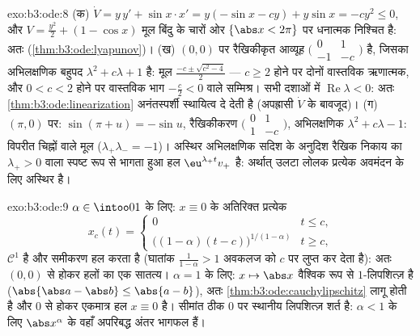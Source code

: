 \begin{solution}{exo:b3:ode:8}
(क) $\dot V = y\,y' + \sin x\cdot x' = y(-\sin x - cy) +
y\sin x = -cy^2 \leq 0$, और $V = \frac{y^2}2 + (1 - \cos x)$ मूल बिंदु के चारों ओर $\{\abs x < 2\pi\}$ पर धनात्मक निश्चित
है: अतः  (\cref{thm:b3:ode:lyapunov})।
(ख) $(0,0)$ पर रैखिकीकृत आव्यूह $\bigl(\begin{smallmatrix}0 & 1\\ -1 &
-c\end{smallmatrix}\bigr)$ है, जिसका अभिलक्षणिक बहुपद $\lambda^2 + c\lambda + 1$
है: मूल $\frac{-c \pm \sqrt{c^2 -
4}}2$ --- $c \geq 2$ होने पर दोनों वास्तविक ऋणात्मक, और $0 < c < 2$ होने
पर वास्तविक भाग $-\frac c2 < 0$ वाले सम्मिश्र। सभी दशाओं में $\operatorname{Re}\lambda < 0$: अतः \cref{thm:b3:ode:linearization}
अनंतस्पर्शी स्थायित्व दे देती है (अपह्रासी $\dot V$ के बावजूद)।
(ग) $(\pi, 0)$ पर: $\sin(\pi + u) = -\sin u$, रैखिकीकरण $\bigl(\begin{smallmatrix}0&1\\1&-c\end{smallmatrix}\bigr)$, अभिलक्षणिक $\lambda^2 + c\lambda - 1$: विपरीत
चिह्नों वाले मूल ($\lambda_+\lambda_- = -1$)। अस्थिर अभिलक्षणिक सदिश के अनुदिश रैखिक
निकाय का $\lambda_+ > 0$ वाला स्पष्ट रूप से भागता हुआ हल $\eu^{\lambda_+t}v_+$ है: अर्थात्
उलटा लोलक प्रत्येक अवमंदन के लिए अस्थिर है।
\end{solution}

\begin{solution}{exo:b3:ode:9}
$\alpha \in \intoo01$ के लिए: $x \equiv 0$ के अतिरिक्त प्रत्येक
\[
x_c(t) = \begin{cases}0 & t \leq c,\\
\bigl((1-\alpha)(t - c)\bigr)^{1/(1-\alpha)} & t \geq c,
\end{cases}
\]
$\mathcal C^1$ है और समीकरण हल करता है (घातांक $\frac1{1-\alpha} > 1$ अवकलज को $c$ पर लुप्त
कर देता है): अतः $(0,0)$ से होकर हलों का एक सातत्य। $\alpha = 1$ के लिए: $x
\mapsto \abs x$
वैश्विक रूप से $1$-लिपशित्ज़ है ($\abs{\abs a - \abs b} \leq \abs{a - b}$), अतः \cref{thm:b3:ode:cauchylipschitz} लागू होती है और
$0$ से होकर एकमात्र हल $x \equiv 0$ है। सीमांत ठीक $0$ पर स्थानीय लिपशित्ज़
शर्त है: $\alpha < 1$ के लिए $\abs x^\alpha$ के वहाँ अपरिबद्ध अंतर भागफल हैं।
\end{solution}

